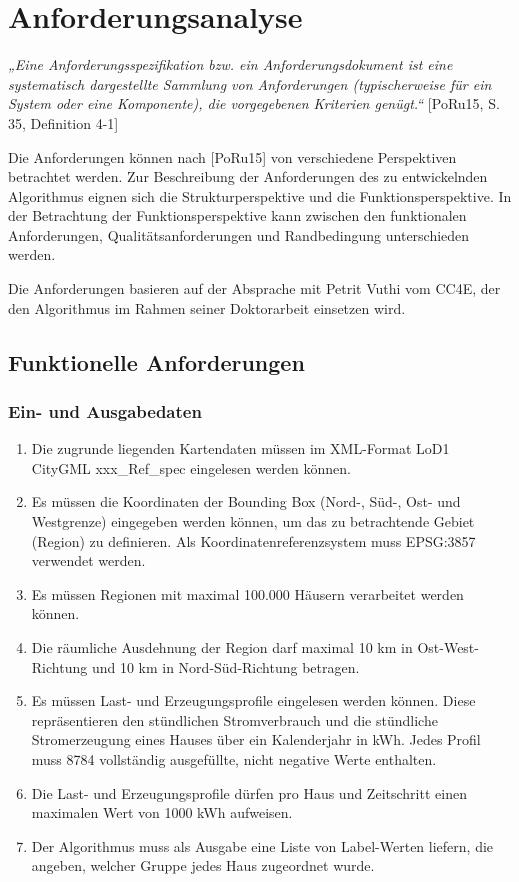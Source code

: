 \chapter{Anforderungsanalyse}
\textit{„Eine Anforderungsspezifikation bzw. ein Anforderungsdokument ist eine systematisch dargestellte Sammlung von Anforderungen (typischerweise für ein System oder eine Komponente), die vorgegebenen Kriterien genügt.“} [PoRu15, S. 35, Definition 4-1] %

Die Anforderungen können nach [PoRu15] von verschiedene Perspektiven betrachtet werden. Zur Beschreibung der Anforderungen des zu entwickelnden Algorithmus eignen sich die Strukturperspektive und die Funktionsperspektive. In der Betrachtung der Funktionsperspektive kann zwischen den funktionalen Anforderungen, Qualitätsanforderungen und Randbedingung unterschieden werden.

Die Anforderungen basieren auf der Absprache mit Petrit Vuthi vom CC4E, der den Algorithmus im Rahmen seiner Doktorarbeit einsetzen wird.

\section{Funktionelle Anforderungen}

\subsection{Ein- und Ausgabedaten}
\begin{enumerate}[label=Req-S-\arabic*:]
    \item Die zugrunde liegenden Kartendaten müssen im XML-Format LoD1 CityGML xxx_Ref_spec eingelesen werden können.
    \item Es müssen die Koordinaten der Bounding Box (Nord-, Süd-, Ost- und Westgrenze) eingegeben werden können, um das zu betrachtende Gebiet (Region) zu definieren. Als Koordinatenreferenzsystem muss EPSG:3857 verwendet werden.
    \item Es müssen Regionen mit maximal 100.000 Häusern verarbeitet werden können.
    \item Die räumliche Ausdehnung der Region darf maximal 10 km in Ost-West-Richtung und 10 km in Nord-Süd-Richtung betragen.
    \item Es müssen Last- und Erzeugungsprofile eingelesen werden können. Diese repräsentieren den stündlichen Stromverbrauch und die stündliche Stromerzeugung eines Hauses über ein Kalenderjahr in kWh. Jedes Profil muss 8784 vollständig ausgefüllte, nicht negative Werte enthalten.
    \item Die Last- und Erzeugungsprofile dürfen pro Haus und Zeitschritt einen maximalen Wert von 1000 kWh aufweisen.
    \item Der Algorithmus muss als Ausgabe eine Liste von Label-Werten liefern, die angeben, welcher Gruppe jedes Haus zugeordnet wurde.
\end{enumerate}

